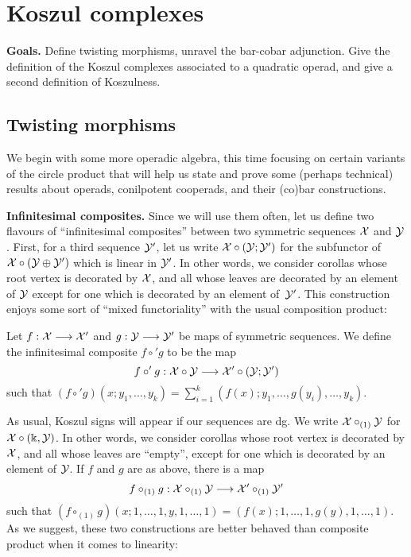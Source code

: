 \section{Koszul complexes}\label{lecture:KD2}

\textbf{Goals.} Define twisting morphisms, unravel the
bar-cobar adjunction. Give the definition of the
Koszul complexes associated to a quadratic operad,
and give a second definition of Koszulness.

\subsection{Twisting morphisms}

We begin with some more operadic algebra, this time focusing
on certain variants of the circle product that will help us
state and prove some (perhaps technical) results about
operads, conilpotent cooperads, and their (co)bar
constructions. 

\medskip

\textbf{Infinitesimal composites.}
Since we will use them often, let us define two flavours of
``infinitesimal composites''  between two symmetric sequences $\mathcal{X}$ and $\mathcal{Y}$.
First, for a third sequence $\mathcal{Y}'$, let us write $\mathcal{X}\circ (\mathcal{Y};\mathcal{Y}')$
for the subfunctor of $\mathcal{X}\circ (\mathcal{Y}\oplus \mathcal{Y}')$ which is linear
in $\mathcal{Y}'$. In other words,  we consider corollas whose root 
vertex is decorated by
$\mathcal{X}$, and all whose leaves are  decorated by an element 
of $\mathcal{Y}$ except for one
which is decorated by an element of~$\mathcal{Y}'$. This construction
enjoys some sort of ``mixed functoriality'' with the usual
composition product:

\begin{definition}
Let $f:\mathcal{X} \longrightarrow \mathcal{X}'$ and $g: \mathcal{Y}\longrightarrow \mathcal{Y}'$
be maps of symmetric sequences. We define the infinitesimal
composite $f\circ' g$ to be the map
\[ f\circ' g: \mathcal{X}\circ \mathcal{Y} \longrightarrow \mathcal{X}'\circ (\mathcal{Y};\mathcal{Y}') \]
such that
$(f\circ' g)(x;y_1,\ldots,y_k) = 
\sum_{i=1}^k (f(x);y_1,\ldots,g(y_i),\ldots,y_k)$.
\end{definition}

As usual, Koszul signs will appear if our sequences are dg.
We write $\mathcal{X}\circ_{(1)} \mathcal{Y}$ for $\mathcal{X}\circ (\Bbbk,\mathcal{Y})$. In other
words, we consider corollas whose root vertex is decorated by
$\mathcal{X}$, and all whose leaves are ``empty'', except for one
which is decorated by an element of $\mathcal{Y}$. If $f$ and $g$
are as above, there is a map
\[
f\circ_{(1)} g : \mathcal{X}\circ_{(1)} \mathcal{Y} \longrightarrow \mathcal{X}'\circ_{(1)} \mathcal{Y}'
\]
such that $(f\circ_{(1)} g )(x;1,\ldots,1,y,1,\ldots,1) = 
 (f(x);1,\ldots,1,g(y),1,\ldots,1)$.
As we suggest,
these two constructions are better behaved than
composite product when it comes to linearity:

